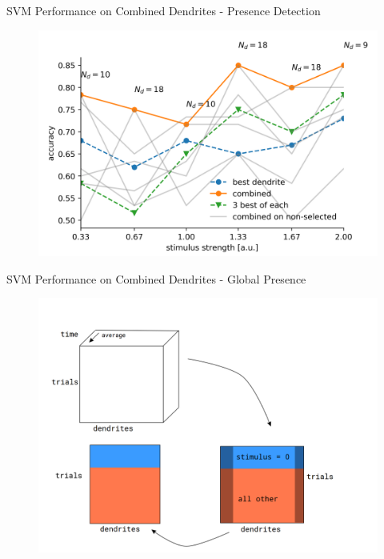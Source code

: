 \documentclass[10pt]{beamer}
\begin{document}
\begin{frame}[fragile]{SVM Performance on Combined Dendrites - Presence Detection}
\begin{center}
	\begin{figure}
      \includegraphics[width=1.0\textwidth]{combined_presence.png}
	\end{figure}
	\end{center}
\end{frame}

\begin{frame}[fragile]{SVM Performance on Combined Dendrites - Global Presence}
\begin{center}
	\begin{figure}
      \includegraphics[width=1.0\textwidth]{data_p_tot.png}
	\end{figure}
	\end{center}
\end{frame}
\end{document}

